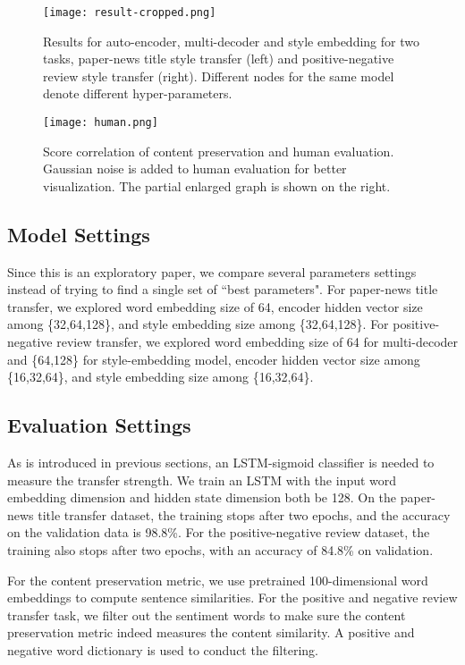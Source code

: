 \documentclass[letterpaper]{article} \usepackage{aaai18}  \usepackage{times}  \usepackage{helvet}  \usepackage{courier}  \usepackage{url}  \usepackage{graphicx}  \usepackage{amsmath}
\begin{document}
\begin{figure*}[htb]
\centering
\texttt{[image: result-cropped.png]}

\caption{Results for auto-encoder, multi-decoder and style embedding for two tasks, 
paper-news title style transfer (left) and positive-negative review style transfer (right).
Different nodes for the same model denote different hyper-parameters.}
\label{figure_result}
\end{figure*}

\begin{figure}[]
\texttt{[image: human.png]}
\caption{Score correlation of content preservation and human evaluation. Gaussian noise is added to human evaluation for better visualization. The partial enlarged graph is shown on the right.}
\label{figure_correlation}
\end{figure}

\subsection{Model Settings} 

Since this is an exploratory paper, we compare several parameters settings instead 
of trying to find a single set of ``best parameters".
For paper-news title transfer, we explored word embedding size of 64, 
encoder hidden vector size among \{32,64,128\}, and style embedding size among \{32,64,128\}.
For positive-negative review transfer, we explored word embedding size 
of 64 for multi-decoder and \{64,128\} for style-embedding model, encoder hidden vector size among \{16,32,64\},
and style embedding size among \{16,32,64\}. 

\subsection{Evaluation Settings}
As is introduced in previous sections, an LSTM-sigmoid classifier is needed to measure the transfer strength. 
We train an LSTM with the input word embedding dimension and hidden state dimension both be 128. 
On the paper-news title transfer dataset, the training stops after two epochs, and the accuracy on the validation data is 98.8\%.
For the positive-negative review dataset, the training also stops after two epochs, with an accuracy of 84.8\% on validation.

For the content preservation metric, we use pretrained 100-dimensional word embeddings to compute sentence similarities. 
For the positive and negative review transfer task, we filter out the sentiment words to make sure the content preservation metric  
indeed measures the content similarity. 
A positive and negative word dictionary is used to conduct the filtering. 
\end{document}
